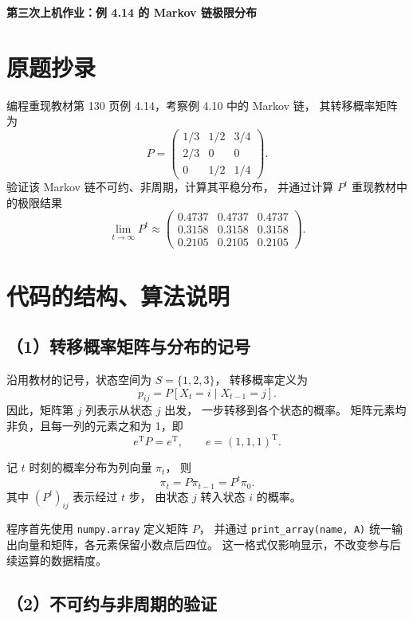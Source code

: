 \documentclass[UTF8,a4paper,11pt,fontset=fandol]{ctexart}
\begin{document}
\pagestyle{plain}

\begin{center}
  {\Large\bfseries 第三次上机作业：例 4.14 的 Markov 链极限分布}
\end{center}

\section{原题抄录}

编程重现教材第 130 页例 4.14，考察例 4.10 中的 Markov 链，
其转移概率矩阵为
\[
P=
\begin{pmatrix}
1/3 & 1/2 & 3/4\\
2/3 & 0   & 0\\
0   & 1/2 & 1/4
\end{pmatrix}.
\]
验证该 Markov 链不可约、非周期，计算其平稳分布，
并通过计算 $P^t$ 重现教材中的极限结果
\[
\lim_{t\to\infty}P^t
\approx
\begin{pmatrix}
0.4737 & 0.4737 & 0.4737\\
0.3158 & 0.3158 & 0.3158\\
0.2105 & 0.2105 & 0.2105
\end{pmatrix}.
\]

\section{代码的结构、算法说明}

\subsection*{（1）转移概率矩阵与分布的记号}

沿用教材的记号，状态空间为 $S=\{1,2,3\}$，
转移概率定义为
\[
p_{ij}=P[X_t=i\mid X_{t-1}=j].
\]
因此，矩阵第 $j$ 列表示从状态 $j$ 出发，
一步转移到各个状态的概率。
矩阵元素均非负，且每一列的元素之和为 1，即
\[
e^{\mathrm T}P=e^{\mathrm T},
\qquad e=(1,1,1)^{\mathrm T}.
\]

记 $t$ 时刻的概率分布为列向量 $\pi_t$，
则
\[
\pi_t=P\pi_{t-1}=P^t\pi_0.
\]
其中 $(P^t)_{ij}$ 表示经过 $t$ 步，
由状态 $j$ 转入状态 $i$ 的概率。

程序首先使用 \texttt{numpy.array} 定义矩阵 $P$，
并通过 \texttt{print\_array(name, A)}
统一输出向量和矩阵，各元素保留小数点后四位。
这一格式仅影响显示，不改变参与后续运算的数据精度。

\subsection*{（2）不可约与非周期的验证}
\end{document}
